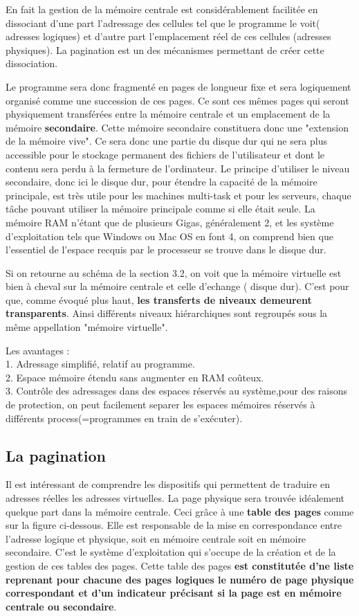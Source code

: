 \documentclass{report}
\begin{document}
{En fait la gestion de la mémoire centrale est considérablement facilitée en dissociant d'une part l'adressage des cellules tel que le programme le voit( adresses logiques) et d'autre part l'emplacement réel de ces cellules (adresses physiques). La pagination est
un des mécanismes permettant de créer cette dissociation.

Le programme sera donc fragmenté en pages de longueur fixe et sera logiquement organisé comme une succession de ces pages. Ce sont ces mêmes pages qui seront physiquement transférées entre la mémoire centrale et un emplacement de la mémoire {\bf secondaire}.
Cette mémoire secondaire constituera donc une "extension de la mémoire vive". Ce sera donc une partie du disque dur qui ne sera plus accessible pour le stockage permanent des fichiers de l'utilisateur et dont le contenu sera perdu à la fermeture de l'ordinateur.
Le principe d'utiliser le niveau secondaire, donc ici le disque dur, pour étendre la capacité de la mémoire principale, est très utile pour les machines multi-task et pour les serveurs, chaque tâche pouvant utiliser la mémoire principale comme si elle était seule. La mémoire RAM n'étant que de plusieurs Gigas, généralement 2, et les système d'exploitation tels que Windows ou Mac OS en font 4, on comprend bien que l'essentiel de l'espace recquis par le processeur se trouve dans le disque dur.

Si on retourne au schéma de la section 3.2, on voit que la mémoire virtuelle est bien à cheval sur la mémoire centrale et celle d'echange ( disque dur). C'est pour que, comme évoqué plus haut, {\bf les transferts de niveaux demeurent transparents}. Ainsi différents niveaux hiérarchiques sont regroupés sous la même appellation "mémoire virtuelle".

Les avantages : \\
1. Adressage simplifié, relatif au programme.\\
2. Espace mémoire étendu sans augmenter en RAM coûteux.\\
3. Contrôle des adressages dans des espaces réservés au système,pour des raisons de protection, on peut facilement separer les espaces mémoires réservés à différents process(=programmes en train de s'exécuter).

\subsection{La pagination}



Il est intéressant de comprendre les dispositifs qui permettent de traduire en adresses réelles les adresses virtuelles. La page physique sera trouvée idéalement quelque part dans la mémoire centrale. Ceci grâce à une {\bf table des pages} comme sur la figure ci-dessous. Elle est responsable de la mise en correspondance entre l'adresse logique et physique, soit en mémoire centrale  soit en mémoire secondaire. C'est le système d'exploitation qui s'occupe de la création et de la gestion de ces tables des pages. Cette table des pages {\bf est constitutée d'ne liste reprenant pour chacune des pages logiques le numéro de page physique correspondant et d'un indicateur précisant si la page est en mémoire centrale ou secondaire}. 


}
\end{document}
